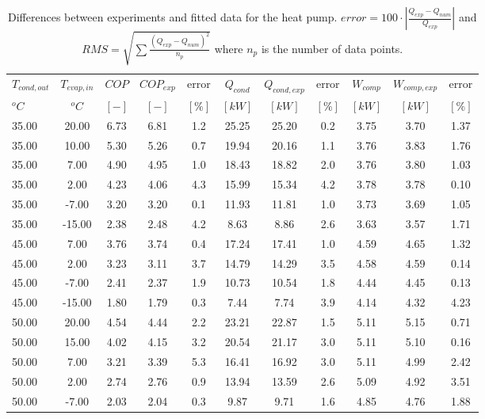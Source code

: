 \documentclass[english]{SPFShortReport}
\begin{document}
\begin{table}[!ht]
\begin{small}
\caption{Differences between experiments and fitted data for the heat pump.          $error=100 \cdot |\frac{Q_{exp}-Q_{num}}{Q_{exp}}|$ and $RMS = \sqrt { \sum{\frac{(Q_{exp}-Q_{num})^2}{n_p}} }$ where $n_p$ is the number of data points.}
\begin{center}
\resizebox{12cm}{!} 
{
\begin{tabular}{l | c c c c c c c c c c } 
\hline
\hline
$T_{cond,out}$ &$T_{evap,in}$ &$COP$ &$COP_{exp}$ &error &$Q_{cond}$ &$Q_{cond,exp}$ &error &$W_{comp}$ &$W_{comp,exp}$ &error \\ 
$^oC$ &$^oC$ &$[-]$ &$[-]$ &$[\%]$ &$[kW]$ &$[kW]$ &$[\%]$ &$[kW]$ &$[kW]$ &$[\%]$\\ 
\hline
35.00  & 20.00 & 6.73 & 6.81 & 1.2 & 25.25 & 25.20 & 0.2 & 3.75 & 3.70 & 1.37\\ 
35.00  & 10.00 & 5.30 & 5.26 & 0.7 & 19.94 & 20.16 & 1.1 & 3.76 & 3.83 & 1.76\\ 
35.00  & 7.00 & 4.90 & 4.95 & 1.0 & 18.43 & 18.82 & 2.0 & 3.76 & 3.80 & 1.03\\ 
35.00  & 2.00 & 4.23 & 4.06 & 4.3 & 15.99 & 15.34 & 4.2 & 3.78 & 3.78 & 0.10\\ 
35.00  & -7.00 & 3.20 & 3.20 & 0.1 & 11.93 & 11.81 & 1.0 & 3.73 & 3.69 & 1.05\\ 
35.00  & -15.00 & 2.38 & 2.48 & 4.2 & 8.63 & 8.86 & 2.6 & 3.63 & 3.57 & 1.71\\ 
45.00  & 7.00 & 3.76 & 3.74 & 0.4 & 17.24 & 17.41 & 1.0 & 4.59 & 4.65 & 1.32\\ 
45.00  & 2.00 & 3.23 & 3.11 & 3.7 & 14.79 & 14.29 & 3.5 & 4.58 & 4.59 & 0.14\\ 
45.00  & -7.00 & 2.41 & 2.37 & 1.9 & 10.73 & 10.54 & 1.8 & 4.44 & 4.45 & 0.13\\ 
45.00  & -15.00 & 1.80 & 1.79 & 0.3 & 7.44 & 7.74 & 3.9 & 4.14 & 4.32 & 4.23\\ 
50.00  & 20.00 & 4.54 & 4.44 & 2.2 & 23.21 & 22.87 & 1.5 & 5.11 & 5.15 & 0.71\\ 
50.00  & 15.00 & 4.02 & 4.15 & 3.2 & 20.54 & 21.17 & 3.0 & 5.11 & 5.10 & 0.16\\ 
50.00  & 7.00 & 3.21 & 3.39 & 5.3 & 16.41 & 16.92 & 3.0 & 5.11 & 4.99 & 2.42\\ 
50.00  & 2.00 & 2.74 & 2.76 & 0.9 & 13.94 & 13.59 & 2.6 & 5.09 & 4.92 & 3.51\\ 
50.00  & -7.00 & 2.03 & 2.04 & 0.3 & 9.87 & 9.71 & 1.6 & 4.85 & 4.76 & 1.88\\ 

\end{tabular}}
\end{center}
\end{small}
\end{table}
\end{document}

